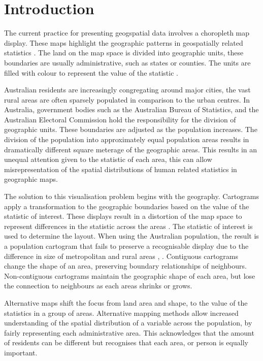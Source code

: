 \documentclass[
]{jss}
\author{
Stephanie Kobakian\\Queensland University of Technology \And Dianne Cook\\Monash University
}
\title{}
\begin{document}
\hypertarget{introduction}{%
\section{Introduction}\label{introduction}}

The current practice for presenting geogspatial data involves a
choropleth map display. These maps highlight the geographic patterns in
geospatially related statistics \citep{SAMGIS}. The land on the map
space is divided into geographic units, these boundaries are usually
administrative, such as states or counties. The units are filled with
colour to represent the value of the statistic \citep{EI}.

Australian residents are increasingly congregating around major cities,
the vast rural areas are often sparsely populated in comparison to the
urban centres. In Australia, government bodies such as the Australian
Bureau of Statistics, and the Australian Electoral Commission hold the
responsibility for the division of geographic units. These boundaries
are adjusted as the population increases. The division of the population
into approximately equal population areas results in dramatically
different square meterage of the geographic areas. This results in an
unequal attention given to the statistic of each area, this can allow
misrepresentation of the spatial distributions of human related
statistics in geographic maps.

The solution to this visualisation problem begins with the geography.
Cartograms apply a transformation to the geographic boundaries based on
the value of the statistic of interest. These displays result in a
distortion of the map space to represent differences in the statistic
across the areas \citep{ACCAC}. The statistic of interest is used to
determine the layout. When using the Australian population, the result
is a population cartogram that fails to preserve a recognisable display
due to the difference in size of metropolitan and rural areas
\citep{ACTUC}, \citep{GOINO}. Contiguous cartograms change the shape of
an area, preserving boundary relationships of neighbours. Non-contiguous
cartograms maintain the geographic shape of each area, but lose the
connection to neighbours as each areas shrinks or grows.

Alternative maps shift the focus from land area and shape, to the value
of the statistics in a group of areas. Alternative mapping methods allow
increased understanding of the spatial distribution of a variable across
the population, by fairly representing each administrative area. This
acknowledges that the amount of residents can be different but
recognises that each area, or person is equally important.
\end{document}
